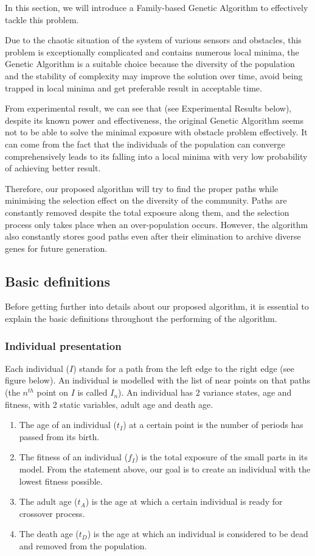 \documentclass[final]{elsarticle}
\begin{document}
In this section, we will introduce a Family-based Genetic Algorithm to effectively tackle this problem.

Due to the chaotic situation of the system of various sensors and obstacles, this problem is exceptionally complicated and contains numerous local minima, the Genetic Algorithm is a suitable choice because the diversity of the population and the stability of complexity may improve the solution over time, avoid being trapped in local minima and get preferable result in acceptable time.

From experimental result, we can see that (see Experimental Results below), despite its known power and effectiveness, the original Genetic Algorithm seems not to be able to solve the minimal exposure with obstacle problem effectively. It can come from the fact that the individuals of the population can converge comprehensively leads to its falling into a local minima with very low probability of achieving better result.

Therefore, our proposed algorithm will try to find the proper paths while minimising the selection effect on the diversity of the community. Paths are constantly removed despite the total exposure along them, and the selection process only takes place when an over-population occurs. However, the algorithm also constantly stores good paths even after their elimination to archive diverse genes for future generation.

\subsection{Basic definitions}

Before getting further into details about our proposed algorithm, it is essential to explain the basic definitions throughout the performing of the algorithm.

\subsubsection{Individual presentation}

Each individual ($I$) stands for a path from the left edge to the right edge (see figure below). An individual is modelled with the list of near points on that paths (the $n^{th}$ point on $I$ is called $I_n$). An individual has 2 variance states, age and fitness, with 2 static variables, adult age and death age.
\begin{enumerate}
	\item The age of an individual ($t_I$) at a certain point is the number of periods has passed from its birth.
	\item The fitness of an individual ($f_I$) is the total exposure of the small parts in its model. From the statement above, our goal is to create an individual with the lowest fitness possible.
	\item The adult age ($t_A$) is the age at which a certain individual is ready for crossover process.
	\item The death age ($t_D$) is the age at which an individual is considered to be dead and removed from the population.
\end{enumerate}
\end{document}
